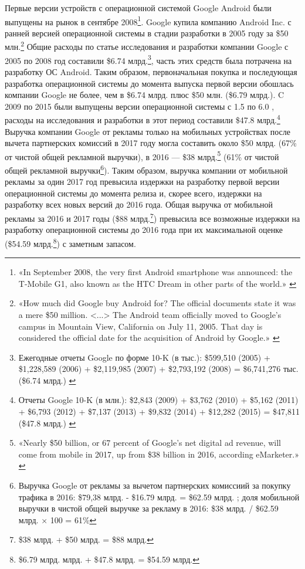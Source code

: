 \documentclass{article}
\begin{document}
Первые версии устройств с операционной системой Google Android были выпущены на рынок в сентябре 2008\footnote{«In September 2008, the very first Android smartphone was announced: the T-Mobile G1, also known as the HTC Dream in other parts of the world.» \cite{androidVersionHistory2024}}. Google купила компанию Android Inc. с ранней версией операционной системы в стадии разработки в 2005 году за \$50 млн.\footnote{«How much did Google buy Android for? The official documents state it was a mere \$50 million. <...> The Android team officially moved to Google’s campus in Mountain View, California on July 11, 2005. That day is considered the official date for the acquisition of Android by Google.» \cite{androidAquiredByGoogleHistory2022}} Общие расходы по статье исследования и разработки компании Google с 2005 по 2008 год составили \$6.74 млрд.\footnote{Ежегодные отчеты Google по форме 10-K (в тыс.): \$599,510 (2005) + \$1,228,589 (2006) + \$2,119,985 (2007) + \$2,793,192 (2008) = \$6,741,276 тыс. (\$6.74 млрд.) \cite{google10K2009}}, часть этих средств была потрачена на разработку ОС Android. Таким образом, первоначальная покупка и последующая разработка операционной системы до момента выпуска первой версии обошлась компании Google не более, чем в \$6.74 млрд. плюс \$50 млн. (\$6.79 млрд.). C 2009 по 2015 были выпущены версии операционной системы с 1.5 по 6.0 \cite{androidVersionHistory2024}, расходы на исследования и разработки в этот период составили \$47.8 млрд.\footnote{Отчеты Google 10-K (в млн.): \$2,843 (2009) + \$3,762 (2010) + \$5,162 (2011) + \$6,793 (2012) + \$7,137 (2013) + \$9,832 (2014) + \$12,282 (2015) = \$47,811 (\$47.8 млрд.) \cite{google10K2009, google10K2012, google10K2015}} Выручка компании Google от рекламы только на мобильных устройствах после вычета партнерских комиссий в 2017 году могла составить около \$50 млрд. (67\% от чистой общей рекламной выручки), в 2016 — \$38 млрд.\footnote{«Nearly \$50 billion, or 67 percent of Google’s net digital ad revenue, will come from mobile in 2017, up from \$38 billion in 2016, according eMarketer.» \cite{googleRevenue2017}} (61\% от чистой общей рекламной выручки\footnote{Выручка Google от рекламы за вычетом партнерских комиссиий за покупку трафика в 2016: \$79,38 млрд. - \$16.79 млрд. = \$62.59 млрд. \cite{google10K2017}; доля мобильной выручки в чистой общей выручке за рекламу в 2016: \$38 млрд. / \$62.59 млрд. × 100 = 61\%}). Таким образом, выручка компании от мобильной рекламы за один 2017 год превысила издержки на разработку первой версии операционной системы до момента релиза и, скорее всего, издержки на разработку всех новых версий до 2016 года. Общая выручка от мобильной рекламы за 2016 и 2017 годы (\$88 млрд.\footnote{\$38 млрд. + \$50 млрд. = \$88 млрд.}) превысила все возможные издержки на разработку операционной системы до 2016 года при их максимальной оценке (\$54.59 млрд.\footnote{\$6.79 млрд. млрд. + \$47.8 млрд. = \$54.59 млрд.}) с заметным запасом.
\end{document}
